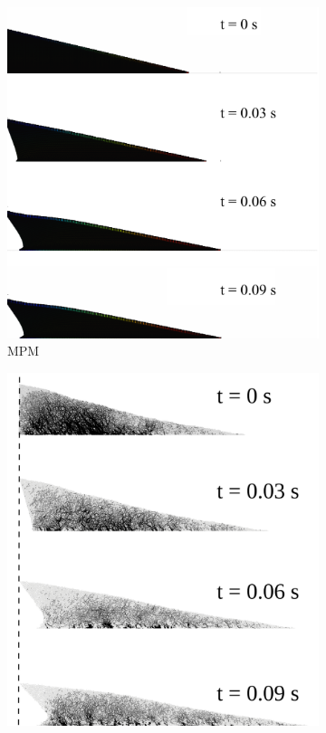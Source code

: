 \documentclass[3p,times,procedia,number]{elsarticle}
\begin{document}
\begin{figure}[tbph]
  \centering
  \begin{subfigure}[b]{0.47\textwidth}
    \centering
    \includegraphics[width=\textwidth]{figs/mpm_gradvelocity_200j}
    \caption{MPM}
    \label{fig:mpm_gradvelocity_200j}
  \end{subfigure}
  \begin{subfigure}[b]{0.42\textwidth}
    \centering
    \includegraphics[width=\textwidth]{figs/dem_gradvelocity_200j}

\end{subfigure}
\end{figure}
\end{document}
